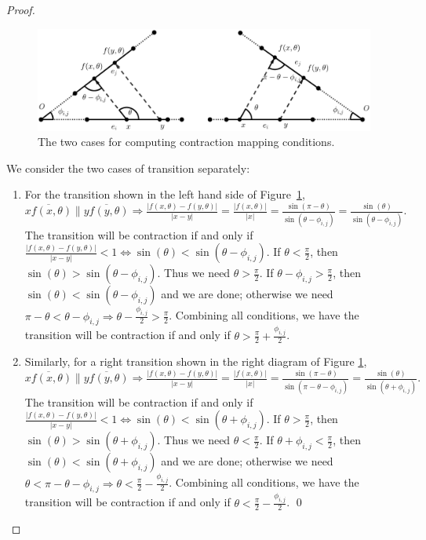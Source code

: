 \documentclass[sageh,times,Review]{sagej}
\begin{document}
\begin{proof}

\begin{figure}
    \includegraphics[width=0.9\columnwidth]{contraction_map_cond.eps}
    \centering
    \caption{The two cases for computing contraction mapping conditions. \label{fig:cont_map}}
    \centering
\end{figure}

We consider the two cases of transition separately:
\begin{enumerate}
    \item For the transition shown in the left hand side of Figure~\ref{fig:cont_map}, 
          $\overline{xf(x, \theta)} \parallel \overline{yf(y, \theta)} \Rightarrow \frac{|f(x, \theta)-f(y, \theta)|}{|x-y|} = \frac{|f(x, \theta)|}{|x|} = \frac{\sin(\pi - \theta)}{\sin(\theta - \phi_{i, j})} = \frac{\sin(\theta)}{\sin(\theta-\phi_{i, j})}.$ The transition will be contraction if and only if $\frac{|f(x, \theta)-f(y, \theta)|}{|x-y|} < 1 \iff \sin(\theta)<\sin(\theta-\phi_{i, j})$. If $\theta < \frac{\pi}{2}$, then $\sin(\theta) > \sin(\theta-\phi_{i, j})$. Thus we need $\theta>\frac{\pi}{2}$. If $\theta-\phi_{i, j} > \frac{\pi}{2}$, then $\sin(\theta) < \sin(\theta-\phi_{i, j})$ and we are done; otherwise we need $\pi - \theta < \theta-\phi_{i, j} \Rightarrow \theta - \frac{\phi_{i, j}}{2} > \frac{\pi}{2}$. Combining all conditions, we have the transition will be contraction if and only if $\theta >\frac{\pi}{2} + \frac{\phi_{i, j}}{2}$.
    \item Similarly, for a right transition shown in the right diagram of
Figure \ref{fig:cont_map},
$\overline{xf(x, \theta)} \parallel \overline{yf(y, \theta)} \Rightarrow \frac{|f(x, \theta)-f(y, \theta)|}{|x-y|} = \frac{|f(x, \theta)|}{|x|} = \frac{\sin(\pi - \theta)}{\sin(\pi -\theta-\phi_{i, j})} = \frac{\sin(\theta)}{\sin(\theta + \phi_{i, j})}.$
The transition will be contraction if and only if
$\frac{|f(x, \theta)-f(y, \theta)|}{|x-y|} < 1 \iff \sin(\theta)<\sin(\theta+\phi_{i, j})$.
If $\theta > \frac{\pi}{2}$, then $\sin(\theta) > \sin(\theta + \phi_{i, j})$.
Thus we need $\theta<\frac{\pi}{2}$. If $\theta+\phi_{i, j} < \frac{\pi}{2}$,
then $\sin(\theta) < \sin(\theta+\phi_{i, j})$ and we are done; otherwise we
need
$\theta < \pi-\theta-\phi_{i, j} \Rightarrow \theta < \frac{\pi}{2} - \frac{\phi_{i, j}}{2}$.
Combining all conditions, we have the transition will be contraction if and only
if $\theta <\frac{\pi}{2} - \frac{\phi_{i, j}}{2}$. \qed
\end{enumerate}
\end{proof}
\end{document}
